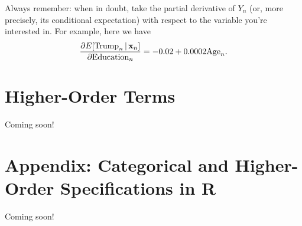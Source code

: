 \documentclass[12pt,oneside,openany]{book}
\begin{document}
Always remember: when in doubt, take the partial derivative of \(Y_n\)
(or, more precisely, its conditional expectation) with respect to the
variable you're interested in. For example, here we have \[
\frac{\partial E[\text{Trump}_n \,|\, \mathbf{x}_n]}{\partial \text{Education}_n} = -0.02 + 0.0002 \text{Age}_n.
\]

\section{Higher-Order Terms}\label{higher-order-terms}

Coming soon!

\section{Appendix: Categorical and Higher-Order Specifications in
R}\label{appendix-categorical-and-higher-order-specifications-in-r}

Coming soon!


\end{document}
